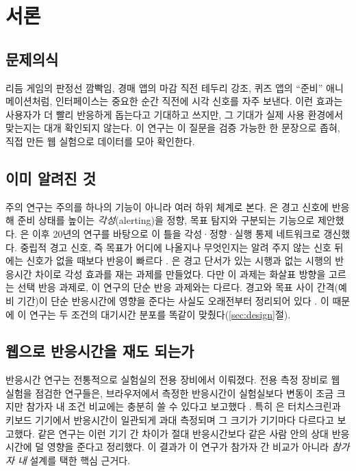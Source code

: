 \section{서론}

\subsection{문제의식}
리듬 게임의 판정선 깜빡임, 경매 앱의 마감 직전 테두리 강조, 퀴즈 앱의 ``준비'' 애니메이션처럼, 인터페이스는 중요한 순간 직전에 시각 신호를 자주 보낸다.
이런 효과는 사용자가 더 빨리 반응하게 돕는다고 기대하고 쓰지만, 그 기대가 실제 사용 환경에서 맞는지는 대개 확인되지 않는다.
이 연구는 이 질문을 검증 가능한 한 문장으로 좁혀, 직접 만든 웹 실험으로 데이터를 모아 확인한다.

\subsection{이미 알려진 것}
주의 연구는 주의를 하나의 기능이 아니라 여러 하위 체계로 본다.
\citet{posner1990}은 경고 신호에 반응해 준비 상태를 높이는 \emph{각성}(alerting)을 정향, 목표 탐지와 구분되는 기능으로 제안했다.
\citet{petersen2012}은 이후 20년의 연구를 바탕으로 이 틀을 각성·정향·실행 통제 네트워크로 갱신했다.
중립적 경고 신호, 즉 목표가 어디에 나올지나 무엇인지는 알려 주지 않는 신호 뒤에는 신호가 없을 때보다 반응이 빠르다 \citep{weinbach2012}.
\citet{fan2002}은 경고 단서가 있는 시행과 없는 시행의 반응시간 차이로 각성 효과를 재는 과제를 만들었다.
다만 이 과제는 화살표 방향을 고르는 선택 반응 과제로, 이 연구의 단순 반응 과제와는 다르다.
경고와 목표 사이 간격(예비 기간)이 단순 반응시간에 영향을 준다는 사실도 오래전부터 정리되어 있다 \citep{niemi1981}.
이 때문에 이 연구는 두 조건의 대기시간 분포를 똑같이 맞췄다(\ref{sec:design}절).

\subsection{웹으로 반응시간을 재도 되는가}
반응시간 연구는 전통적으로 실험실의 전용 장비에서 이뤄졌다.
전용 측정 장비로 웹 실험을 점검한 연구들은, 브라우저에서 측정한 반응시간이 실험실보다 변동이 조금 크지만
참가자 내 조건 비교에는 충분히 쓸 수 있다고 보고했다 \citep{reimers2015,bridges2020,anwylirvine2021}.
특히 \citet{pronk2020}은 터치스크린과 키보드 기기에서 반응시간이 일관되게 과대 측정되며 그 크기가 기기마다 다르다고 보고했다.
같은 연구는 이런 기기 간 차이가 절대 반응시간보다 같은 사람 안의 상대 반응시간에 덜 영향을 준다고 정리했다.
이 결과가 이 연구가 참가자 간 비교가 아니라 \emph{참가자 내} 설계를 택한 핵심 근거다.

